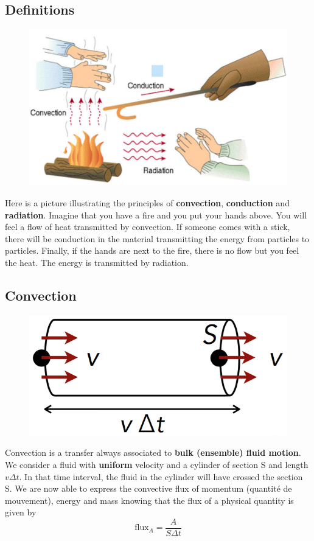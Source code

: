\subsection{Definitions}
\begin{figure}
	\vspace{-5mm}
	\includegraphics[scale=0.3]{ch1/1}
\end{figure}
Here is a picture illustrating the principles of \textbf{convection}, \textbf{conduction} and \textbf{radiation}. Imagine that you have a fire and you put your hands above. You will feel a flow of heat transmitted by convection. If someone comes with a stick, there will be conduction in the material transmitting the energy from particles to particles. Finally, if the hands are next to the fire, there is no flow but you feel the heat. The energy is transmitted by radiation. 
	
\newpage

\subsection{Convection}
\begin{figure}
	\vspace{-5mm}
	\includegraphics[scale=0.3]{ch1/2}
\end{figure}
Convection is a transfer always associated to \textbf{bulk (ensemble) fluid motion}. We consider a fluid with \textbf{uniform} velocity and a cylinder of section S and length $v \Delta t$. In that time interval, the fluid in the cylinder will have crossed the section S. We are now able to express the convective flux of momentum (quantité de mouvement), energy and mass knowing that the flux of a physical quantity is given by 
\begin{equation}
	\text{flux}_A = \frac{A}{S\Delta t}
	\label{equation:1.5}
\end{equation}
	
